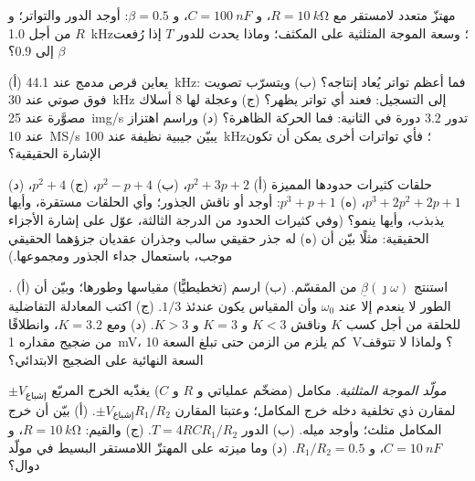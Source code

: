 \begin{exercise}[$\star$]\label{exo:b2:feedback-oscillators:3}
مهتزّ متعدد لامستقر مع $R = \qty{10}{k\ohm}$، و $C = \qty{100}{nF}$، و $\beta = 0.5$:
أوجد الدور والتواتر؛ و $R$ من أجل \qty{1.0}{kHz}؛ وسعة الموجة المثلثية
على المكثف؛ وماذا يحدث للدور $T$ إذا رُفعت $\beta$ إلى $0.9$؟
\end{exercise}

\begin{exercise}[$\star$]\label{exo:b2:feedback-oscillators:4}
(أ) يعاين قرص مدمج عند \qty{44.1}{kHz}: فما أعظم تواتر يُعاد إنتاجه؟ (ب) ويتسرّب
تصويت فوق صوتي عند \qty{30}{kHz} إلى التسجيل: فعند أي تواتر
يظهر؟ (ج) وعجلة لها $8$ أسلاك مصوَّرة عند \qty{25}{img/s} تدور
$3.2$ دورة في الثانية: فما الحركة الظاهرة؟ (د) وراسم اهتزاز عند \qty{10}{MS/s}
يبيّن جيبية نظيفة عند \qty{100}{kHz}؛ فأي تواترات أخرى يمكن أن تكون
الإشارة الحقيقية؟
\end{exercise}

\begin{exercise}[$\star\star$]\label{exo:b2:feedback-oscillators:5}
حلقات كثيرات حدودها المميزة (أ) $p^2 + 3p + 2$، (ب) $p^2 - p +
4$، (ج) $p^2 + 4$، (د) $p^3 + 2p^2 + 2p + 1$، (ه) $p^3 + p + 1$: أوجد أو
ناقش الجذور؛ وأي الحلقات مستقرة، وأيها يذبذب، وأيها ينمو؟
(وفي كثيرات الحدود من الدرجة الثالثة، عوّل على إشارة الأجزاء الحقيقية: مثلًا بيّن أن (ه)
له جذر حقيقي سالب وجذران عقديان جزؤهما الحقيقي
موجب، باستعمال جداء الجذور ومجموعها.)
\end{exercise}

\begin{exercise}[$\star\star$]\label{exo:b2:feedback-oscillators:6}
\emph{.} (أ) استنتج $\underline\beta(\jmath\omega)$ من المقسّم.
(ب) ارسم (تخطيطيًّا) مقياسها وطورها؛ وبيّن أن الطور لا ينعدم إلا عند
$\omega_0$ وأن المقياس يكون عندئذ $1/3$. (ج) اكتب المعادلة
التفاضلية للحلقة من أجل كسب $K$ وناقش $K < 3$ و $K = 3$ و $K > 3$.
(د) ومع $K = 3.2$، وانطلاقًا من ضجيج مقداره \qty{1}{mV}، كم يلزم من الزمن حتى تبلغ
السعة \qty{10}{V}؟ ولماذا لا تتوقف السعة النهائية على
الضجيج الابتدائي؟
\end{exercise}

\begin{exercise}[$\star\star$]\label{exo:b2:feedback-oscillators:7}
\emph{مولّد الموجة المثلثية.} مكامل (مضخّم عملياتي و $R$ و $C$) يغذّيه
الخرج المربّع $\pm V_{\text{إشباع}}$ لمقارن ذي تخلفية دخله
خرج المكامل؛ وعتبتا المقارن
$\pm V_{\text{إشباع}}R_1/R_2$. (أ) بيّن أن خرج المكامل مثلث؛
وأوجد ميله. (ب) الدور $T = 4RCR_1/R_2$. (ج) والقيم: $R = \qty{10}{k\ohm}$،
و $C = \qty{10}{nF}$، و $R_1/R_2 = 0.5$. (د) وما ميزته على المهتزّ اللامستقر البسيط
في مولّد دوال؟
\end{exercise}

